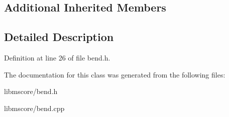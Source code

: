\subsection*{Additional Inherited Members}


\subsection{Detailed Description}


Definition at line 26 of file bend.\+h.



The documentation for this class was generated from the following files\+:\begin{DoxyCompactItemize}
\item 
libmscore/bend.\+h\item 
libmscore/bend.\+cpp\end{DoxyCompactItemize}
